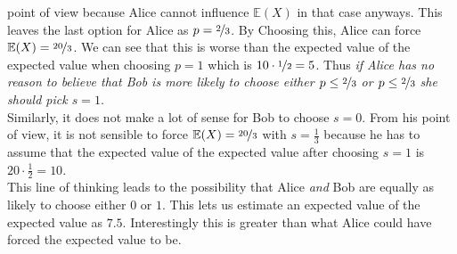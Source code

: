 \documentclass{article}
\newcommand{\E}{\mathbb{E}}
\begin{document}
point of view because Alice cannot influence $\E(X)$ in that case anyways.
This leaves the last option for Alice as $p=\nicefrac{2}{3}$. 
By Choosing this, Alice can force $\E(X)=\nicefrac{20}{3}$. 
We can see that this is worse than the expected value of the 
expected value when choosing $p=1$ which is $10\cdot\nicefrac{1}{2}=5$. 
Thus \emph{if Alice has no reason to believe that Bob is more likely 
to choose either $p\leq\nicefrac{2}{3}$ or $p\leq\nicefrac{2}{3}$
she should pick $s=1$}.\\
Similarly, it does not make a lot of sense for Bob to choose $s=0$.
From his point of view, it is not sensible to force 
$\E(X)=\nicefrac{20}{3}$ with $s=\frac{1}{3}$ because he has to 
assume that the expected value of the expected value 
after choosing $s=1$ is $20\cdot \frac{1}{2}=10$.\\
This line of thinking leads to the possibility that Alice \emph{and}
Bob are equally as likely to choose either $0$ or $1$. This lets us
estimate an expected value of the expected value as $7.5$. Interestingly
this is greater than what Alice could have forced the expected value to 
be.
\end{document}
